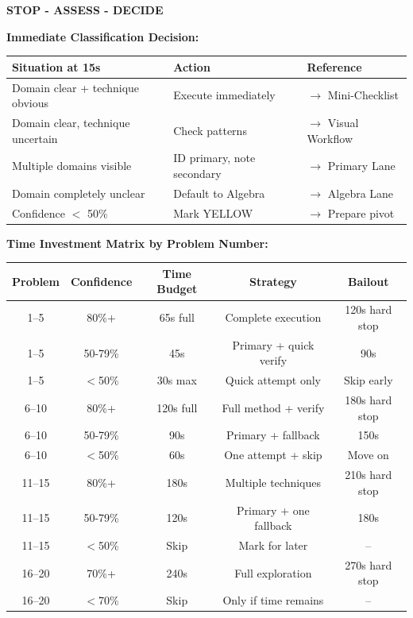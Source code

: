 \documentclass{article}
\begin{document}
\begin{tcolorbox}[colback=yellow!5!white,colframe=orange!75!black,title={\textbf{QUICK DECISION CARD - 15 Second Checkpoint}}]
   \begin{center}
   \large\textbf{STOP - ASSESS - DECIDE}
   \end{center}
   \vspace{2mm}
   
   \textbf{Immediate Classification Decision:}
   \begin{center}
   \begin{tabular}{|l|l|l|}
   \hline
   \textbf{Situation at 15s} & \textbf{Action} & \textbf{Reference} \\
   \hline
   Domain clear + technique obvious & Execute immediately & $\rightarrow$ Mini-Checklist \\
   Domain clear, technique uncertain & Check patterns & $\rightarrow$ Visual Workflow \\
   Multiple domains visible & ID primary, note secondary & $\rightarrow$ Primary Lane \\
   Domain completely unclear & Default to Algebra & $\rightarrow$ Algebra Lane \\
   Confidence $<$ 50\% & Mark YELLOW & $\rightarrow$ Prepare pivot \\
   \hline
   \end{tabular}
   \end{center}
   
   \vspace{3mm}
   \textbf{Time Investment Matrix by Problem Number:}
   \begin{center}
   \begin{tabular}{|c|c|c|c|c|}
   \hline
   \textbf{Problem} & \textbf{Confidence} & \textbf{Time Budget} & \textbf{Strategy} & \textbf{Bailout} \\
   \hline
   1--5 & 80\%+ & 65s full & Complete execution & 120s hard stop \\
   1--5 & 50-79\% & 45s & Primary + quick verify & 90s \\
   1--5 & $<$50\% & 30s max & Quick attempt only & Skip early \\
   \hline
   6--10 & 80\%+ & 120s full & Full method + verify & 180s hard stop \\
   6--10 & 50-79\% & 90s & Primary + fallback & 150s \\
   6--10 & $<$50\% & 60s & One attempt + skip & Move on \\
   \hline
   11--15 & 80\%+ & 180s & Multiple techniques & 210s hard stop \\
   11--15 & 50-79\% & 120s & Primary + one fallback & 180s \\
   11--15 & $<$50\% & Skip & Mark for later & -- \\
   \hline
   16--20 & 70\%+ & 240s & Full exploration & 270s hard stop \\
   16--20 & $<$70\% & Skip & Only if time remains & -- \\
   \hline
   \end{tabular}
   \end{center}
   

\end{tcolorbox}
\end{document}
